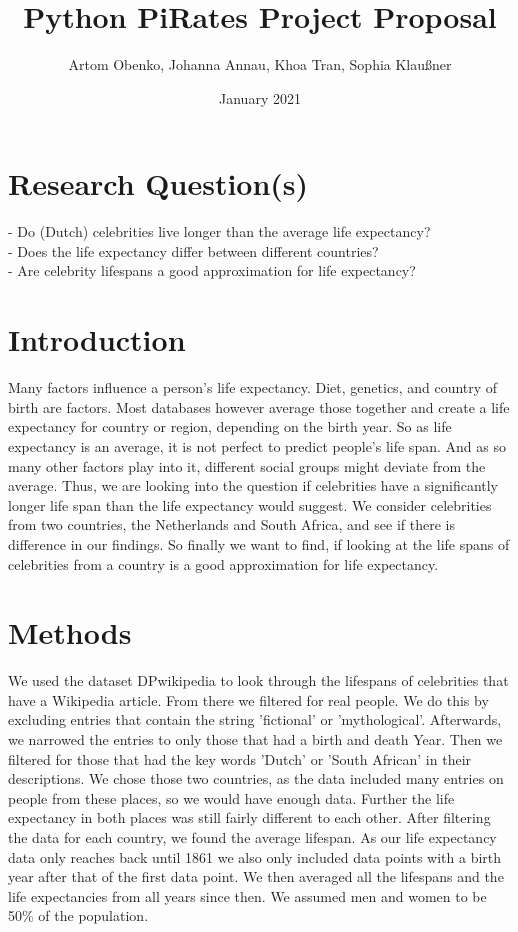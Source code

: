 \documentclass{article}
\title{Python PiRates Project Proposal}
\author{Artom Obenko, Johanna Annau, Khoa Tran, Sophia Klaußner}
\date{January 2021}
\begin{document}
	
\maketitle
	
\section{Research Question(s)}
	- Do (Dutch) celebrities live longer than the average life expectancy?\\
	- Does the life expectancy differ between different countries?\\
	- Are celebrity lifespans a good approximation for life expectancy?\\
	
\section{Introduction}
Many factors influence a person's life expectancy. Diet, genetics, and country of birth are factors. Most databases however average those together and create a life expectancy for country or region, depending on the birth year. %
So as life expectancy is an average, it is not perfect to predict people's life span. And as so many other factors play into it, different social groups might deviate from the average. Thus, we are looking into the question if celebrities have a significantly longer life span than the life expectancy would suggest. We consider celebrities from two countries, the Netherlands and South Africa, and see if there is difference in our findings. So finally we want to find, if looking at the life spans of celebrities from a country is a good approximation for life expectancy.

\section{Methods}
We used the dataset DPwikipedia to look through the lifespans of celebrities that have a Wikipedia article. From there we filtered for real people. We do this by excluding entries that contain the string 'fictional' or 'mythological'. Afterwards, we narrowed the entries to only those that had a birth and death Year. Then we filtered for those that had the key words 'Dutch' or 'South African' in their descriptions. We chose those two countries, as the data included many entries on people from these places, so we would have enough data. Further the life expectancy in both places was still fairly different to each other. After filtering the data for each country, we found the average lifespan. As our life expectancy data only reaches back until 1861 we also only included data points with a birth year after that of the first data point. We then averaged all the lifespans and the life expectancies from all years since then. We assumed men and women to be 50\% of the population.
 
\end{document}
